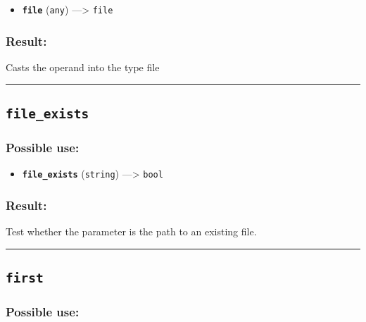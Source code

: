 \documentclass[]{book}
\providecommand{\tightlist}{%
  \setlength{\itemsep}{0pt}\setlength{\parskip}{0pt}}
\theoremstyle{definition}
\theoremstyle{definition}
\theoremstyle{definition}
\theoremstyle{remark}
\begin{document}
\begin{itemize}
\tightlist
\item
  \textbf{\texttt{file}} (\texttt{any}) ---\textgreater{} \texttt{file}
\end{itemize}

\subsubsection{Result:}\label{result-159}

Casts the operand into the type file

\begin{center}\rule{0.5\linewidth}{\linethickness}\end{center}

\subsection{\texorpdfstring{\texttt{file\_exists}}{file\_exists}}\label{file_exists}

\subsubsection{Possible use:}\label{possible-use-166}

\begin{itemize}
\tightlist
\item
  \textbf{\texttt{file\_exists}} (\texttt{string}) ---\textgreater{}
  \texttt{bool}
\end{itemize}

\subsubsection{Result:}\label{result-160}

Test whether the parameter is the path to an existing file.

\begin{center}\rule{0.5\linewidth}{\linethickness}\end{center}

\subsection{\texorpdfstring{\texttt{first}}{first}}\label{first}

\subsubsection{Possible use:}\label{possible-use-167}
\end{document}
